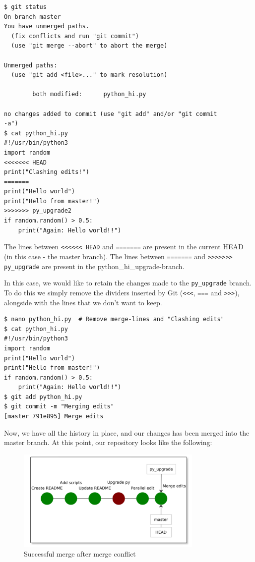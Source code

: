 \documentclass[../main/git_course_main.tex]{subfiles}
\begin{document}
\begin{codebox}
\begin{lstlisting}
$ git status
On branch master
You have unmerged paths.
  (fix conflicts and run "git commit")
  (use "git merge --abort" to abort the merge)

Unmerged paths:
  (use "git add <file>..." to mark resolution)

        both modified:      python_hi.py
        
no changes added to commit (use "git add" and/or "git commit 
-a")
$ cat python_hi.py
#!/usr/bin/python3
import random
<<<<<<< HEAD
print("Clashing edits!")
=======
print("Hello world")
print("Hello from master!")
>>>>>>> py_upgrade2
if random.random() > 0.5:
    print("Again: Hello world!!")
\end{lstlisting}
\end{codebox}

The lines between \verb$<<<<<< HEAD$ and \verb$=======$ are present in the current HEAD (in this case - the master branch). The lines between \verb$=======$ and \verb$>>>>>>> py_upgrade$ are present in the python\_hi\_upgrade-branch.

In this case, we would like to retain the changes made to the \verb$py_upgrade$ branch. To do this we simply remove the dividers inserted by Git (\verb$<<<$, \verb$===$ and \verb$>>>$), alongside with the lines that we don't want to keep.

\begin{codebox}
\begin{lstlisting}
$ nano python_hi.py  # Remove merge-lines and "Clashing edits"
$ cat python_hi.py
#!/usr/bin/python3
import random
print("Hello world")
print("Hello from master!")
if random.random() > 0.5:
    print("Again: Hello world!!")
$ git add python_hi.py
$ git commit -m "Merging edits"
[master 791e895] Merge edits
\end{lstlisting}
\end{codebox}

Now, we have all the history in place, and our changes has been merged into the master branch.
At this point, our repository looks like the following:

\begin{figure}[h!]
	\centering
	\includegraphics[width=0.8\textwidth]{../visualizations/chapter4/46_successful_merge_post_conflict.pdf}
	\caption{Successful merge after merge conflict}
	\label{fig:after_merged_conflict}
\end{figure}
\end{document}
